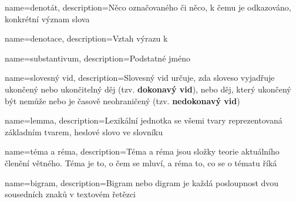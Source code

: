{
	name=denotát,
	description={Něco označovaného či něco, k čemu je odkazováno, konkrétní význam slova}
}

{
	name=denotace,
	description={Vztah výrazu k }
}

{
	name=substantivum,
	description={Podstatné jméno}
}

{
	name=slovesný vid,
	description={Slovesný vid určuje, zda sloveso vyjadřuje ukončený nebo ukončitelný děj (tzv. \textbf{dokonavý vid}), nebo děj, který ukončený být nemůže nebo je časově neohraničený (tzv. \textbf{nedokonavý vid})}
}

{
	name=lemma,
	description={Lexikální jednotka se všemi tvary reprezentovaná základním tvarem, heslové slovo ve slovníku}
}

{
	name=téma a réma,
	description={Téma a réma jsou složky teorie aktuálního členění větného. Téma je to, o čem se mluví, a réma to, co se o tématu říká }
}

{
	name=bigram,
	description={Bigram nebo digram je každá posloupnost dvou sousedních znaků v textovém řetězci}
}





